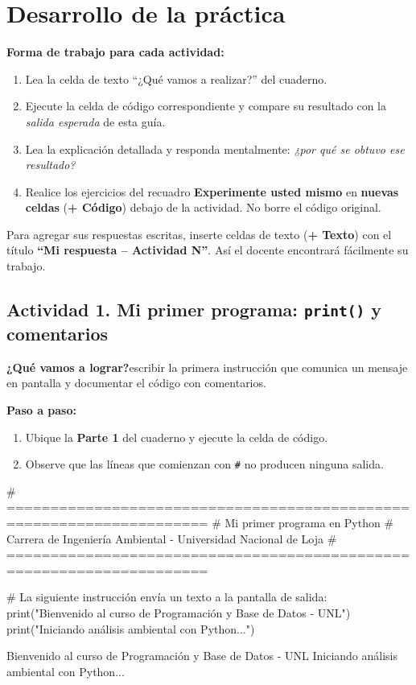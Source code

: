 \documentclass[11pt,a4paper]{article}
\newcommand{\code}[1]{\texttt{#1}}
\newcommand{\menu}[1]{\textbf{\color{moradoOsc}#1}}
\newcommand{\actividad}[1]{\begin{objetivo}\textbf{\color{tealProfundo}¿Qué vamos a lograr?}\enspace #1\end{objetivo}}
\begin{document}
\section{Desarrollo de la práctica}

\textbf{Forma de trabajo para cada actividad:}
\begin{enumerate}
  \item Lea la celda de texto ``¿Qué vamos a realizar?'' del cuaderno.
  \item Ejecute la celda de código correspondiente y compare su resultado con la \emph{salida esperada} de esta guía.
  \item Lea la explicación detallada y responda mentalmente: \emph{¿por qué se obtuvo ese resultado?}
  \item Realice los ejercicios del recuadro \textbf{Experimente usted mismo} en \textbf{nuevas celdas} (\menu{+ Código}) debajo de la actividad. No borre el código original.
\end{enumerate}

\begin{tip}
Para agregar sus respuestas escritas, inserte celdas de texto (\menu{+ Texto}) con el título \textbf{``Mi respuesta -- Actividad N''}. Así el docente encontrará fácilmente su trabajo.
\end{tip}

\subsection{Actividad 1. Mi primer programa: \code{print()} y comentarios}
\actividad{escribir la primera instrucción que comunica un mensaje en pantalla y documentar el código con comentarios.}

\textbf{Paso a paso:}
\begin{enumerate}
  \item Ubique la \textbf{Parte 1} del cuaderno y ejecute la celda de código.
  \item Observe que las líneas que comienzan con \code{\#} no producen ninguna salida.
\end{enumerate}

\begin{codigo}
# =====================================================================
# Mi primer programa en Python
# Carrera de Ingeniería Ambiental - Universidad Nacional de Loja
# =====================================================================

# La siguiente instrucción envía un texto a la pantalla de salida:
print("Bienvenido al curso de Programación y Base de Datos - UNL")
print("Iniciando análisis ambiental con Python...")
\end{codigo}
\begin{salida}
Bienvenido al curso de Programación y Base de Datos - UNL
Iniciando análisis ambiental con Python...
\end{salida}
\end{document}
